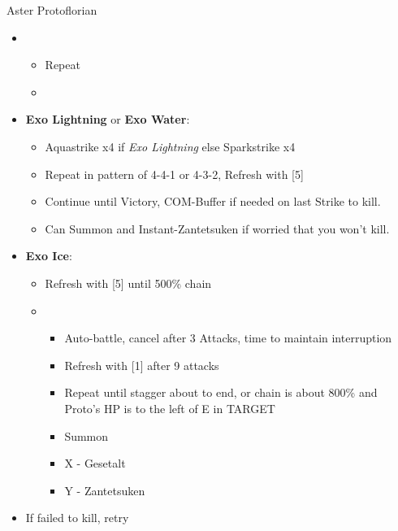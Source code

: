 \begin{battle}[1:43]{Aster Protoflorian}
\begin{multicols}{2}
\begin{itemize}
            \columnbreak
      \item \fourth
            \begin{itemize}
              \item Repeat
              \item \stagger
            \end{itemize}
      \item \textbf{Exo Lightning} or \textbf{Exo Water}:
            \begin{itemize}
              \item Aquastrike x4 if \textit{Exo Lightning} else Sparkstrike x4
              \item Repeat in pattern of 4-4-1 or 4-3-2, Refresh with [5]
              \item Continue until Victory, COM-Buffer if needed on last Strike to kill.
              \item Can Summon and Instant-Zantetsuken if worried that you won't kill.
            \end{itemize}
      \item \textbf{Exo Ice}:
            \begin{itemize}
              \item Refresh with [5] until 500\% chain
              \item \sixth
                    \begin{itemize}
                      \item Auto-battle, cancel after 3 Attacks, time to maintain interruption
                      \item Refresh with [1] after 9 attacks
                      \item Repeat until stagger about to end, or chain is about 800\% and Proto's HP is to the left of E in TARGET
                      \item Summon
                      \item X - Gesetalt
                      \item Y - Zantetsuken
                    \end{itemize}
            \end{itemize}
      \item If failed to kill, retry
    \end{itemize}
  \end{multicols}
\end{battle}
